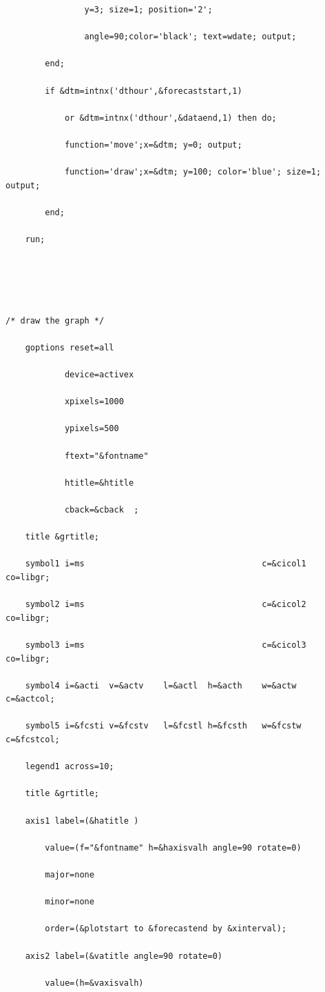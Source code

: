 \documentclass[10pt]{sugconf-ish}
\begin{document}
\begin{verbatim}
                y=3; size=1; position='2';  

                angle=90;color='black'; text=wdate; output;

        end;

        if &dtm=intnx('dthour',&forecaststart,1) 

            or &dtm=intnx('dthour',&dataend,1) then do;

            function='move';x=&dtm; y=0; output;

            function='draw';x=&dtm; y=100; color='blue'; size=1; output;

        end;

    run;





/* draw the graph */

    goptions reset=all

            device=activex 

            xpixels=1000

            ypixels=500 

            ftext="&fontname" 

            htitle=&htitle 

            cback=&cback  ;

    title &grtitle;

    symbol1 i=ms                                    c=&cicol1  co=libgr;

    symbol2 i=ms                                    c=&cicol2  co=libgr;

    symbol3 i=ms                                    c=&cicol3  co=libgr;

    symbol4 i=&acti  v=&actv    l=&actl  h=&acth    w=&actw    c=&actcol;

    symbol5 i=&fcsti v=&fcstv   l=&fcstl h=&fcsth   w=&fcstw   c=&fcstcol;

    legend1 across=10;

    title &grtitle;

    axis1 label=(&hatitle ) 

        value=(f="&fontname" h=&haxisvalh angle=90 rotate=0)  

        major=none

        minor=none

        order=(&plotstart to &forecastend by &xinterval);

    axis2 label=(&vatitle angle=90 rotate=0) 

        value=(h=&vaxisvalh) 


\end{verbatim}
\end{document}
